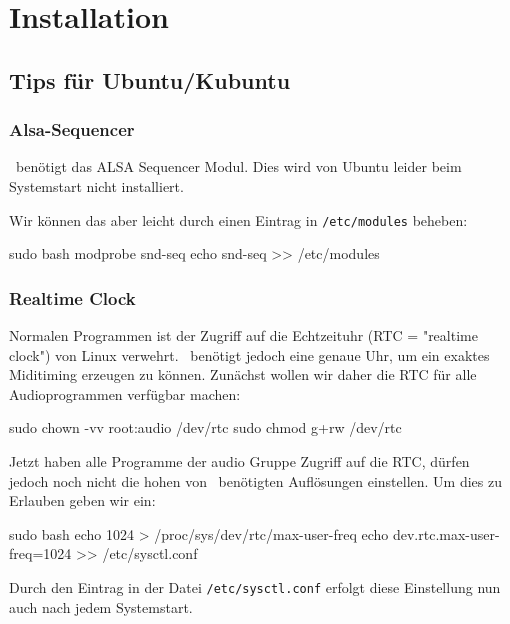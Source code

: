 \chapter{Installation}
  \section{Tips für Ubuntu/Kubuntu}

    \subsection{Alsa-Sequencer}

      \M\ benötigt das ALSA Sequencer Modul. Dies wird von Ubuntu leider
      beim Systemstart nicht installiert.

      Wir können das aber leicht durch einen Eintrag in {\tt /etc/modules}
      beheben:

      \starttyping
            sudo bash
            modprobe snd-seq
            echo snd-seq >> /etc/modules
      \stoptyping


    \subsection{Realtime Clock}

      Normalen Programmen ist der Zugriff auf die Echtzeituhr 
      (RTC = "realtime clock") von Linux
      verwehrt. \M\ benötigt jedoch eine genaue Uhr, um ein exaktes
      Miditiming erzeugen zu können.
      Zunächst wollen wir daher die RTC für alle Audioprogrammen
      verfügbar machen:

      \starttyping
            sudo chown -vv root:audio /dev/rtc
            sudo chmod g+rw /dev/rtc
      \stoptyping

      Jetzt haben alle Programme der audio Gruppe Zugriff auf die
      RTC, dürfen jedoch noch nicht die hohen von \M\ benötigten
      Auflösungen einstellen.
      Um dies zu Erlauben geben wir ein:

      \starttyping
            sudo bash
            echo 1024 > /proc/sys/dev/rtc/max-user-freq
            echo dev.rtc.max-user-freq=1024 >> /etc/sysctl.conf
      \stoptyping

      Durch den Eintrag in der Datei {\tt /etc/sysctl.conf} erfolgt diese
      Einstellung nun auch nach jedem Systemstart.
